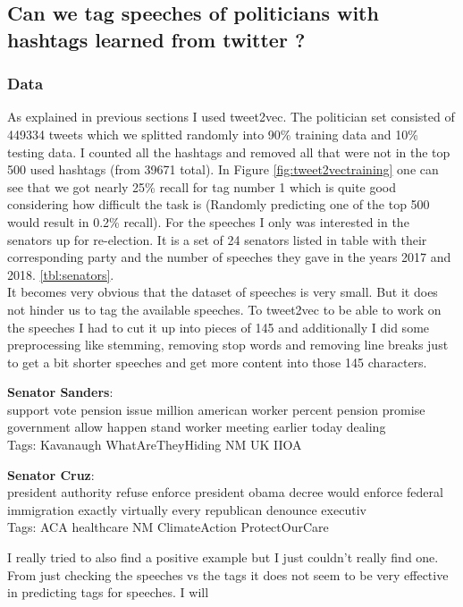 \documentclass[10pt,conference,compsocconf]{IEEEtran}
\begin{document}
\subsection{Can we tag speeches of politicians with hashtags learned from twitter ? }
\subsubsection{Data}
As explained in previous sections I used tweet2vec. The politician set consisted of 449334 tweets which we splitted randomly into 90\% training data and 10\% testing data. I counted all the hashtags and removed all that were not in the top 500 used hashtags (from 39671 total).  In Figure \ref{fig:tweet2vectraining} one can see that we got nearly 25\% recall for tag number 1 which is quite good considering how difficult the task is (Randomly predicting one of the top 500 would result in 0.2\% recall). For the speeches I only was interested in the senators up for re-election. It is a set of 24 senators listed in table with their corresponding party and the number of speeches they gave in the years 2017 and 2018. \ref{tbl:senators}. \\
It becomes very obvious that the dataset of speeches is very small. But it does not hinder us to tag the available speeches. To tweet2vec to be able to work on the speeches I had to cut it up into pieces of 145 and additionally I did some preprocessing like stemming, removing stop words and removing line breaks just to get a bit shorter speeches and get more content into those 145 characters. 

\begin{framed}
	\textbf{Senator Sanders}: \\
	support vote pension issue million american worker percent pension promise government allow happen stand worker meeting earlier today dealing \\
	Tags: Kavanaugh WhatAreTheyHiding NM UK IIOA
\end{framed}
\begin{framed}
	\textbf{Senator Cruz}: \\
 president authority refuse enforce president obama decree would enforce federal immigration exactly virtually every republican denounce executiv
 \\
	Tags: ACA healthcare NM ClimateAction ProtectOurCare
\end{framed}

I really tried to also find a positive example but I just couldn't really find one. From just checking the speeches vs the tags it does not seem to be very effective in predicting tags for speeches. I will 
\end{document}
